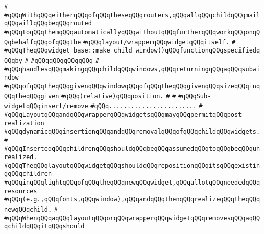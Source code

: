 \verb|#|\newline
\verb|#qQQqWithqQQqeitherqQQqofqQQqtheseqQQqrouters,qQQqallqQQqchildqQQqmailqQQqwillqQQqbeqQQqrouted|\newline
\verb|#qQQqtoqQQqthemqQQqautomaticallyqQQqwithoutqQQqfurtherqQQqworkqQQqonqQQqbehalfqQQqofqQQqthe|\newline
\verb|#qQQqlayout/wrapperqQQqwidgetqQQqitself.|\newline
\verb|#|\newline
\verb|#qQQqTheqQQqwidget_base::make_child_window()qQQqfunctionqQQqspecifiedqQQqby|\newline
\verb|#|\newline
\verb|#qQQqqQQqqQQqqQQq|\newline
\verb|#|\newline
\verb|#qQQqhandlesqQQqmakingqQQqchildqQQqwindows,qQQqreturningqQQqaqQQqsubwindow|\newline
\verb|#qQQqofqQQqtheqQQqgivenqQQqwindowqQQqofqQQqtheqQQqgivenqQQqsizeqQQqinqQQqtheqQQqgiven|\newline
\verb|#qQQq(relative)qQQqposition.|\newline
\verb|#|\newline
\verb|#|\newline
\verb|#qQQqSub-widgetqQQqinsert/remove|\newline
\verb|#qQQq........................|\newline
\verb|#|\newline
\verb|#qQQqLayoutqQQqandqQQqwrapperqQQqwidgetsqQQqmayqQQqpermitqQQqpost-realization|\newline
\verb|#qQQqdynamicqQQqinsertionqQQqandqQQqremovalqQQqofqQQqchildqQQqwidgets.|\newline
\verb|#|\newline
\verb|#qQQqInsertedqQQqchildrenqQQqshouldqQQqbeqQQqassumedqQQqtoqQQqbeqQQqunrealized.|\newline
\verb|#qQQqTheqQQqlayoutqQQqwidgetqQQqshouldqQQqrepositionqQQqitsqQQqexistingqQQqchildren|\newline
\verb|#qQQqinqQQqlightqQQqofqQQqtheqQQqnewqQQqwidget,qQQqallotqQQqneededqQQqresources|\newline
\verb|#qQQq(e.g.,qQQqfonts,qQQqwindow),qQQqandqQQqthenqQQqrealizeqQQqtheqQQqnewqQQqchild.|\newline
\verb|#|\newline
\verb|#qQQqWhenqQQqaqQQqlayoutqQQqorqQQqwrapperqQQqwidgetqQQqremovesqQQqaqQQqchildqQQqitqQQqshould|\newline
